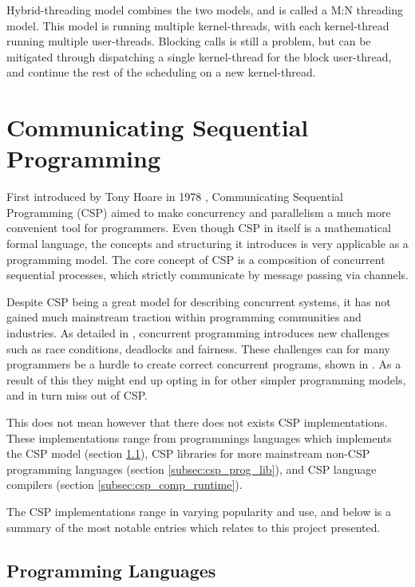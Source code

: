 Hybrid-threading model combines the two models, and is called a M:N threading model. This model is running multiple kernel-threads, with each kernel-thread running multiple user-threads. Blocking calls is still a problem, but can be mitigated through dispatching a single kernel-thread for the block user-thread, and continue the rest of the scheduling on a new kernel-thread. 


\section{Communicating Sequential Programming}
\label{sec:csp}

First introduced by Tony Hoare in 1978 \citep{csp}, Communicating Sequential Programming (CSP) aimed to make concurrency and parallelism a much more convenient tool for programmers. Even though CSP in itself is a mathematical formal language, the concepts and structuring it introduces is very applicable as a programming model. The core concept of CSP is a composition of concurrent sequential processes, which strictly communicate by message passing via channels.

Despite CSP being a great model for describing concurrent systems, it has not gained much mainstream traction within programming communities and industries. As detailed in \citet{benari2006}, concurrent programming introduces new challenges such as race conditions, deadlocks and fairness. These challenges can for many programmers be a hurdle to create correct concurrent programs, shown in \citet{ousterhour1996}. As a result of this they might end up opting in for other simpler programming models, and in turn miss out of CSP. 

This does not mean however that there does not exists CSP implementations. These implementations range from programmings languages which implements the CSP model (section \ref{subsec:csp_prog_lang}), CSP libraries for more mainstream non-CSP programming languages (section \ref{subsec:csp_prog_lib}), and CSP language compilers (section \ref{subsec:csp_comp_runtime}).

The CSP implementations range in varying popularity and use, and below is a summary of the most notable entries which relates to this project presented.


\subsection{Programming Languages}
\label{subsec:csp_prog_lang}

